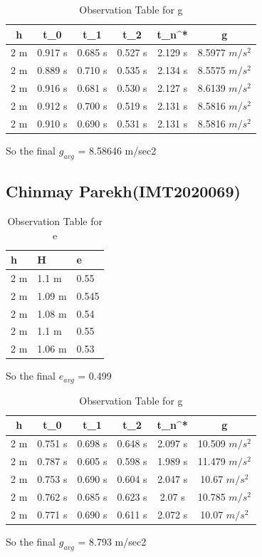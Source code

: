 \documentclass[11pt]{scrartcl} %
\begin{document}
\begin{table}[h]
\centering
\begin{tabular}{||c c c c c c||} 
\toprule
 \hline
 h & t_0 & t_1 & t_2 & t_n^* & g \\ [0.5ex] 
 \midrule
 \hline\hline
 2 m & 0.917 s & 0.685 s  & 0.527 s & 2.129 s & 8.5977 $m/s^2$  \\ 
 \hline
 2 m & 0.889 s & 0.710 s & 0.535 s & 2.134 s & 8.5575 $m/s^2$  \\
 \hline
 2 m & 0.916 s & 0.681 s & 0.530 s & 2.127 s  & 8.6139 $m/s^2$   \\
 \hline
 2 m & 0.912 s & 0.700 s & 0.519 s & 2.131 s  & 8.5816 $m/s^2$   \\
 \hline
 2 m & 0.910 s & 0.690 s & 0.531 s & 2.131 s  & 8.5816 $m/s^2$  \\ [1ex] 
 \bottomrule
 \hline
\end{tabular}
\caption{Observation Table for g}
\end{table}
So the final $g_{avg}$ = 8.58646 m/sec2

\newpage
\subsection{Chinmay Parekh(IMT2020069)}

\begin{table}[h] %
	\centering %
	\begin{tabular}{l l l}
		\toprule
		\textbf{h} & \textbf{H} & \textbf{e} \\
		\midrule
		2 m & 1.1 m & 0.55\\
        2 m & 1.09 m  & 0.545\\
        2 m & 1.08 m  & 0.54\\
        2 m & 1.1 m & 0.55 \\
        2 m & 1.06 m & 0.53 \\
		\bottomrule
	\end{tabular}
	\caption{Observation Table for e}
\end{table}
So the final $e_{avg}$ = 0.499

\begin{table}[h]
\centering
\begin{tabular}{||c c c c c c||} 
\toprule
 \hline
 h & t_0 & t_1 & t_2 & t_n^* & g \\ [0.5ex] 
 \midrule
 \hline\hline
 2 m & 0.751 s & 0.698 s  & 0.648 s & 2.097 s & 10.509 $m/s^2$  \\ 
 \hline
 2 m & 0.787 s & 0.605 s & 0.598 s & 1.989 s & 11.479 $m/s^2$  \\
 \hline
 2 m & 0.753 s & 0.690 s & 0.604 s & 2.047 s  & 10.67 $m/s^2$   \\
 \hline
 2 m & 0.762 s & 0.685 s & 0.623 s & 2.07 s  & 10.785 $m/s^2$   \\
 \hline
 2 m & 0.771 s & 0.690 s & 0.611 s & 2.072 s  & 10.07 $m/s^2$  \\ [1ex]
 \bottomrule
 \hline
\end{tabular}
\caption{Observation Table for g}
\end{table}
So the final $g_{avg}$ = 8.793 m/sec2
\newpage
\end{document}
